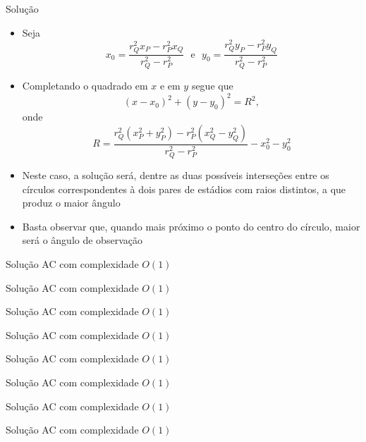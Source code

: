 \begin{frame}[fragile]{Solução}

    \begin{itemize}
        \item Seja
        \[
            x_0 = \frac{r_Q^2x_P - r_P^2x_Q}{r_Q^2 - r_P^2}\ \ \ \mbox{e}\ \ \ 
            y_0 = \frac{r_Q^2y_P - r_P^2y_Q}{r_Q^2 - r_P^2}
        \]

        \item Completando o quadrado em $x$ e em $y$ segue que
        \[
            (x - x_0)^2 + (y - y_0)^2 = R^2,
        \]
        onde
        \[
            R = \frac{r_Q^2(x_P^2 + y_P^2) - r_P^2(x_Q^2 - y_Q^2)}{r_Q^2 - r_P^2} - x_0^2 - y_0^2
        \]

        \item Neste caso, a solução será, dentre as duas possíveis interseções entre os 
            círculos correspondentes à dois pares de estádios com raios distintos, a que 
            produz o maior ângulo

        \item Basta observar que, quando mais próximo o ponto do centro do círculo, maior será o
            ângulo de observação
    \end{itemize}

\end{frame}

\begin{frame}[fragile]{Solução AC com complexidade $O(1)$}
\end{frame}

\begin{frame}[fragile]{Solução AC com complexidade $O(1)$}
\end{frame}

\begin{frame}[fragile]{Solução AC com complexidade $O(1)$}
\end{frame}

\begin{frame}[fragile]{Solução AC com complexidade $O(1)$}
\end{frame}

\begin{frame}[fragile]{Solução AC com complexidade $O(1)$}
\end{frame}

\begin{frame}[fragile]{Solução AC com complexidade $O(1)$}
\end{frame}

\begin{frame}[fragile]{Solução AC com complexidade $O(1)$}
\end{frame}

\begin{frame}[fragile]{Solução AC com complexidade $O(1)$}
\end{frame}




